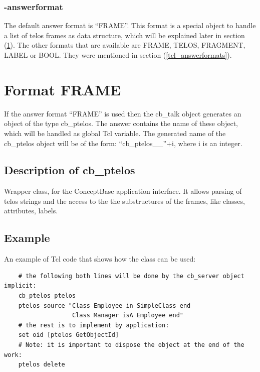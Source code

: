    \subsubsection{-answerformat}
    \label{tcl_slot_answerformat}
	The default answer format is ``FRAME''.
	This format is a special object to handle a list of telos frames
	 as data structure, 
	 which will be explained later in section (\ref{cb_ptelos}).
	The other formats that are available are 
		FRAME, TELOS, FRAGMENT, LABEL or BOOL.
	They were mentioned in section (\ref{tcl_answerformats}).

	
 \section{Format FRAME} \label{cb_ptelos}
	If the answer format ``FRAME'' is used then the cb\_talk object
	generates an object of the type cb\_ptelos.
	The answer contains the name of these object, 
	 which will be handled as global Tcl variable.
	The generated name of the cb\_ptelos object will be of the form:
	 ``cb\_ptelos\_\_''+i, where i is an integer. \\
	
  \subsection{Description of cb\_ptelos}
	Wrapper class, for the ConceptBase application interface. 
	It allows parsing of telos strings and the access to the 
	the substructures of the frames, like classes, attributes, labels. 

 \subsection{Example} 
  \label{ptelos_example}
	An example of Tcl code that shows how the class can be used:
  \begin{verbatim}
    # the following both lines will be done by the cb_server object implicit:
    cb_ptelos ptelos
    ptelos source "Class Employee in SimpleClass end
                   Class Manager isA Employee end"
    # the rest is to implement by application:
    set oid [ptelos GetObjectId]
    # Note: it is important to dispose the object at the end of the work:
    ptelos delete
  \end{verbatim}
